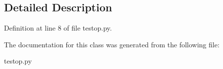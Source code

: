 \subsection{Detailed Description}


Definition at line 8 of file testop.\+py.



The documentation for this class was generated from the following file\+:\begin{DoxyCompactItemize}
\item 
testop.\+py\end{DoxyCompactItemize}
